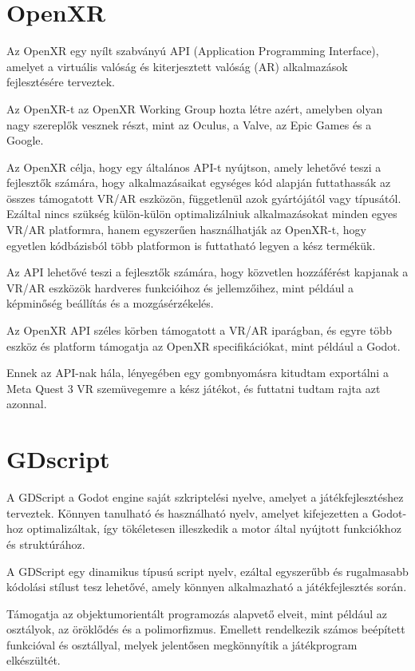 \section{OpenXR}
Az OpenXR egy nyílt szabványú API (Application Programming Interface), amelyet a virtuális valóság és kiterjesztett valóság (AR) alkalmazások fejlesztésére terveztek. 

Az OpenXR-t az OpenXR Working Group  hozta létre azért, amelyben olyan nagy szereplők vesznek részt, mint az Oculus, a Valve, az Epic Games és a Google.

Az OpenXR célja, hogy egy általános API-t nyújtson, amely lehetővé teszi a fejlesztők számára, hogy alkalmazásaikat egységes kód alapján futtathassák az összes támogatott VR/AR eszközön, függetlenül azok gyártójától vagy típusától. 
Ezáltal nincs szükség külön-külön optimalizálniuk alkalmazásokat minden egyes VR/AR platformra, hanem egyszerűen használhatják az OpenXR-t, hogy egyetlen kódbázisból több platformon is futtatható legyen a kész termékük.

Az API lehetővé teszi a fejlesztők számára, hogy közvetlen hozzáférést kapjanak a VR/AR eszközök hardveres funkcióihoz és jellemzőihez, mint például a képminőség beállítás és a mozgásérzékelés.

Az OpenXR API széles körben támogatott a VR/AR iparágban, és egyre több eszköz és platform támogatja az OpenXR specifikációkat, mint például a Godot.

Ennek az API-nak hála, lényegében egy gombnyomásra kitudtam exportálni a Meta Quest 3 VR szemüvegemre a kész játékot, és futtatni tudtam rajta azt azonnal.

\section{GDscript}
A GDScript a Godot engine saját szkriptelési nyelve, amelyet a játékfejlesztéshez terveztek. 
Könnyen tanulható és használható nyelv, amelyet kifejezetten a Godot-hoz optimalizáltak, így tökéletesen illeszkedik a motor által nyújtott funkciókhoz és struktúrához.

A GDScript egy dinamikus típusú script nyelv, ezáltal egyszerűbb és rugalmasabb kódolási stílust tesz lehetővé, amely könnyen alkalmazható a játékfejlesztés során.

Támogatja az objektumorientált programozás alapvető elveit, mint például az osztályok, az öröklődés és a polimorfizmus. Emellett rendelkezik számos beépített funkcióval és osztállyal, melyek jelentősen megkönnyítik a játékprogram elkészültét.
